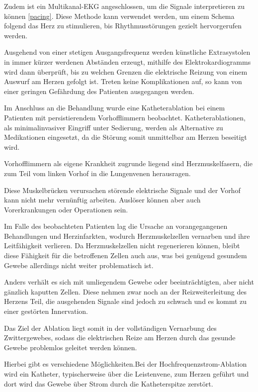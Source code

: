 \documentclass[11pt,a4paper,titlepage]{scrartcl}
\begin{document}
\newpage 
Zudem ist ein Multikanal-EKG angeschlossen, um die Signale interpretieren zu können \ref{pacing}.
Diese Methode kann verwendet werden, um einem Schema folgend das Herz zu stimulieren, bis Rhythmusstörungen gezielt hervorgerufen werden. \medskip

Ausgehend von einer stetigen Ausgangsfrequenz werden künstliche Extrasystolen in immer kürzer werdenen Abständen erzeugt, mithilfe des Elektrokardiogramms wird dann überprüft, bis zu welchen Grenzen die elektrische Reizung von einem Auswurf am Herzen gefolgt ist. Treten keine Komplikationen auf, so kann von einer geringen Gefährdung des Patienten ausgegangen werden. \medskip

Im Anschluss an die Behandlung wurde eine Katheterablation bei einem Patienten mit persistierendem Vorhofflimmern beobachtet.
Katheterablationen, als minimalinvasiver Eingriff unter Sedierung, werden als Alternative zu Medikationen eingesetzt, da die Störung somit unmittelbar am Herzen beseitigt wird. \medskip


Vorhofflimmern als eigene Krankheit zugrunde liegend sind Herzmuskelfasern, die zum Teil vom linken Vorhof in die Lungenvenen herausragen. \medskip

Diese Muskelbrücken verursachen störende elektrische Signale und der Vorhof kann nicht mehr vernünftig arbeiten. Auslöser können aber auch Vorerkrankungen oder Operationen sein. \medskip

Im Falle des beobachteten Patienten lag die Ursache an vorangegangenen Behandlungen und Herzinfarkten, wodurch Herzmuskelzellen vernarben und ihre Leitfähigkeit verlieren. Da Herzmuskelzellen nicht regenerieren können, bleibt diese Fähigkeit für die betroffenen Zellen auch aus, was bei genügend gesundem Gewebe allerdings nicht weiter problematisch ist. \medskip

Anders verhält es sich mit umliegendem Gewebe oder beeinträchtigten, aber nicht gänzlich kaputten Zellen. Diese nehmen zwar noch an der Reizweiterleitung des Herzens Teil, die ausgehenden Signale sind jedoch zu schwach und es kommt zu einer gestörten Innervation. \medskip

Das Ziel der Ablation liegt somit in der vollständigen Vernarbung des Zwittergewebes, sodass die elektrischen Reize am Herzen durch das gesunde Gewebe problemlos geleitet werden können. \medskip

Hierbei gibt es verschiedene Möglichkeiten.Bei der Hochfrequenzstrom-Ablation wird ein Katheter, typischerweise über die Leistenvene, zum Herzen geführt und dort wird das Gewebe über Strom durch die Katheterspitze zerstört. \medskip
\end{document}

